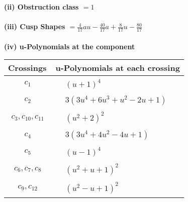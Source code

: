 \documentclass[1p]{elsarticle_modified}
\theoremstyle{definition}
\begin{document}
\flushleft \textbf{(ii) Obstruction class $= 1$}\\~\\
\flushleft \textbf{(iii) Cusp Shapes $= \frac{4}{17} a u-\frac{40}{17} a+\frac{8}{17} u-\frac{80}{17}$}\\~\\
\newpage\renewcommand{\arraystretch}{1}
\flushleft \textbf{(iv) u-Polynomials at the component}\newline \\
\begin{tabular}{m{50pt}|m{274pt}}
Crossings & \hspace{64pt}u-Polynomials at each crossing \\
\hline $$\begin{aligned}c_{1}\end{aligned}$$&$\begin{aligned}
&(u+1)^4
\end{aligned}$\\
\hline $$\begin{aligned}c_{2}\end{aligned}$$&$\begin{aligned}
&3(3 u^4+6 u^3+u^2-2 u+1)
\end{aligned}$\\
\hline $$\begin{aligned}c_{3},c_{10},c_{11}\end{aligned}$$&$\begin{aligned}
&(u^2+2)^2
\end{aligned}$\\
\hline $$\begin{aligned}c_{4}\end{aligned}$$&$\begin{aligned}
&3(3 u^4+4 u^2-4 u+1)
\end{aligned}$\\
\hline $$\begin{aligned}c_{5}\end{aligned}$$&$\begin{aligned}
&(u-1)^4
\end{aligned}$\\
\hline $$\begin{aligned}c_{6},c_{7},c_{8}\end{aligned}$$&$\begin{aligned}
&(u^2+u+1)^2
\end{aligned}$\\
\hline $$\begin{aligned}c_{9},c_{12}\end{aligned}$$&$\begin{aligned}
&(u^2- u+1)^2
\end{aligned}$\\
\hline
\end{tabular}\\~\\
\end{document}
